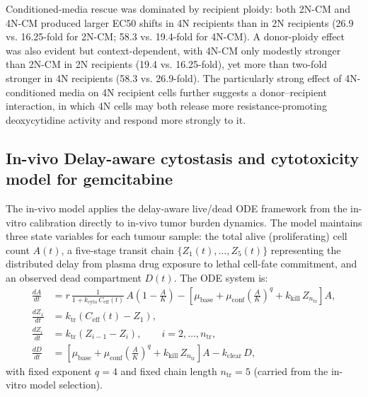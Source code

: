 \documentclass[11pt,notitlepage]{article}
\begin{document}
Conditioned-media rescue was dominated by recipient ploidy: both 2N-CM and 4N-CM produced larger EC50 shifts in 4N recipients than in 2N recipients (26.9 vs. 16.25-fold for 2N-CM; 58.3 vs. 19.4-fold for 4N-CM). A donor-ploidy effect was also evident but context-dependent, with 4N-CM only modestly stronger than 2N-CM in 2N recipients (19.4 vs. 16.25-fold), yet more than two-fold stronger in 4N recipients (58.3 vs. 26.9-fold). The particularly strong effect of 4N-conditioned media on 4N recipient cells further suggests a donor--recipient interaction, in which 4N cells may both release more resistance-promoting deoxycytidine activity and respond more strongly to it.


  
\subsection{In-vivo Delay-aware cytostasis and cytotoxicity model for gemcitabine}
The in-vivo model applies the delay-aware live/dead ODE framework from the
in-vitro calibration directly to in-vivo tumor burden dynamics. The model maintains
three state variables for each tumour sample: the total alive (proliferating)
cell count $A(t)$, a five-stage transit chain
$\{Z_1(t),\ldots,Z_5(t)\}$ representing the distributed delay from
plasma drug exposure to lethal cell-fate commitment, and an observed dead
compartment $D(t)$.
The ODE system is:
\begin{align}
\frac{dA}{dt}
&=
r\,\frac{1}{1+k_{\mathrm{cyto}}\,C_{\mathrm{eff}}(t)}\,
A\!\left(1-\frac{A}{K}\right)
-
\left[
  \mu_{\mathrm{base}}
  +\mu_{\mathrm{conf}}\!\left(\frac{A}{K}\right)^{\!q}
  +k_{\mathrm{kill}}\,Z_{n_{\mathrm{tr}}}
\right]A,
\label{eq:invivo_dA}
\\
\frac{dZ_1}{dt}
&=
k_{\mathrm{tr}}\!\left(C_{\mathrm{eff}}(t)-Z_1\right),
\\
\frac{dZ_i}{dt}
&=
k_{\mathrm{tr}}\!\left(Z_{i-1}-Z_i\right),\qquad i=2,\ldots,n_{\mathrm{tr}},
\\
\frac{dD}{dt}
&=
\left[
  \mu_{\mathrm{base}}
  +\mu_{\mathrm{conf}}\!\left(\frac{A}{K}\right)^{\!q}
  +k_{\mathrm{kill}}\,Z_{n_{\mathrm{tr}}}
\right]A
-k_{\mathrm{clear}}\,D,
\label{eq:invivo_dD}
\end{align}
with fixed exponent $q=4$ and fixed chain length $n_{\mathrm{tr}}=5$
(carried from the in-vitro model selection).
\end{document}
